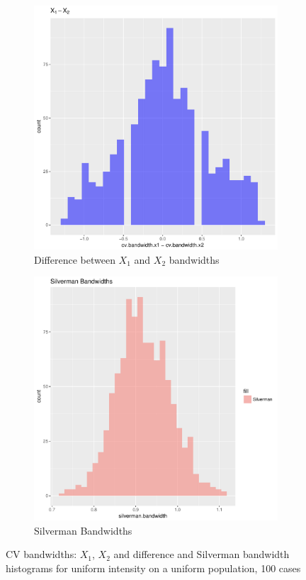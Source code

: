 \begin{figure}[htbp]
    \begin{subfigure}[b]{0.45\textwidth}
    \includegraphics[width=\textwidth]{output/bandwidths-difference}
    \caption{Difference between \(X_1\) and \(X_2\) bandwidths}
    \end{subfigure}
    \begin{subfigure}[b]{0.45\textwidth}
    \includegraphics[width=\textwidth]{output/bandwidths-silverman}
    \caption{Silverman Bandwidths}
    \end{subfigure}
    \caption[Bandwidths: uniform on uniform]{CV bandwidths: \(X_1\), \(X_2\) and difference and Silverman bandwidth
        histograms for uniform intensity on a uniform population, 100 cases}
    \label{fig:bandwidths:template}
\end{figure}


